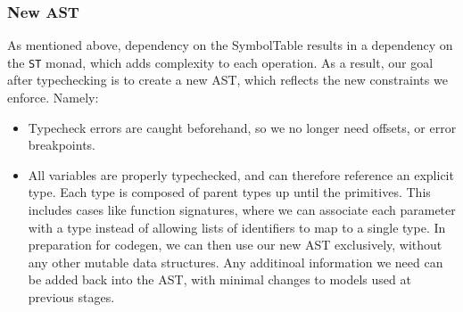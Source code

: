 \documentclass[11pt]{article}
\begin{document}
\subsubsection{New AST}
As mentioned above, dependency on the SymbolTable results in a
dependency on the \texttt{ST} monad, which adds complexity to each
operation.  As a result, our goal after typechecking is to create a
new AST, which reflects the new constraints we enforce.  Namely:
\begin{itemize}
	\item Typecheck errors are caught beforehand, so we no longer need offsets,
	      or error breakpoints.
	\item All variables are properly typechecked, and can therefore reference an
	      explicit type. Each type is composed of parent types up until the
	      primitives.  This includes cases like function signatures, where
	      we can associate each parameter with a type instead of allowing
	      lists of identifiers to map to a single type.  In preparation for
	      codegen, we can then use our new AST exclusively, without any
	      other mutable data structures. Any additinoal information we need
	      can be added back into the AST, with minimal changes to models
	      used at previous stages.
\end{itemize}
\end{document}
